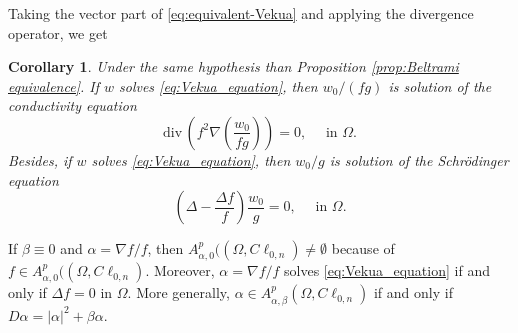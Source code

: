 \documentclass[12pt]{article}
\newtheorem{corollary}[theorem]{Corollary}
\def\div{\mbox{div}\,}
\begin{document}
Taking the vector part of \eqref{eq:equivalent-Vekua} and applying the divergence operator, we get
\begin{corollary}\label{cor:conductividad-Schrodinger}
Under the same hypothesis than Proposition \ref{prop:Beltrami equivalence}. If $w$ solves \eqref{eq:Vekua_equation}, then   $w_0/(fg)$ is solution of the conductivity equation 
\begin{equation}\label{eq:conductivity}
   \div \left(f^2 \nabla\left(\dfrac{w_0}{fg}\right)\right)=0, \quad \text{ in }\Omega.
\end{equation}
Besides, if $w$ solves \eqref{eq:Vekua_equation}, then $w_0/g$ is solution of the Schrödinger equation
\begin{equation}\label{eq:Schrodinger}
   \left(\Delta-\dfrac{\Delta f }{f}\right)\dfrac{w_0}{g}=0, \quad \text{ in }\Omega.
\end{equation}
\end{corollary}

If $\beta\equiv 0$ and $\alpha=\nabla f/f$, then $A_{\alpha,0}^p((\Omega,C\ell_{0,n})\ne \emptyset$ because of $f\in A_{\alpha,0}^p((\Omega,C\ell_{0,n})$. Moreover, $\alpha=\nabla f/f$ solves \eqref{eq:Vekua_equation} if and only if $\Delta f=0$ in $\Omega$. More generally, $\alpha\in A_{\alpha,\beta}^p(\Omega,C\ell_{0,n})$ if and only if $D\alpha=|\alpha|^2 +\beta \alpha$.
\end{document}
